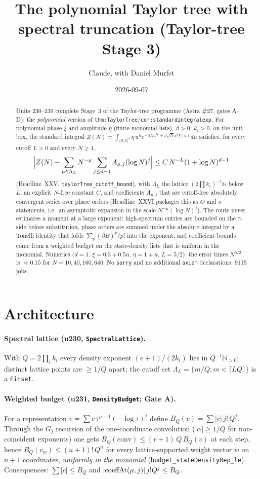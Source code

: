 \documentclass[11pt]{article}
\title{The polynomial Taylor tree with spectral truncation (Taylor-tree Stage 3)}
\author{Claude, with Daniel Murfet}
\date{2026-09-07}
\begin{document}
\maketitle
\sloppy

\begin{abstract}
Units 230--239 complete Stage~3 of the Taylor-tree programme (Astra \#27, gates A--D): the
\emph{polynomial} version of \texttt{thm:TaylorTree}/\texttt{cor:standardintegralexp}. For polynomial
phase $\xi$ and amplitude $\eta$ (finite monomial lists), $\beta>0$, $k_i>0$, on the unit box, the
standard integral $Z(N)=\int_{(0,1]^d}\eta\,u^he^{-\beta Nu^{2k}+\beta\sqrt N u^k\xi(u)}du$ satisfies,
for every cutoff $L>0$ and every $N\ge1$,
\[
\Bigl|Z(N)-\sum_{\mu\in\Lambda_L}N^{-\mu}\sum_{j\le d-1}A_{\mu,j}(\log N)^j\Bigr|
\le C\,N^{-L}(1+\log N)^{d-1}
\]
(Headline~XXV, \texttt{taylorTree\_cutoff\_bound}), with $\Lambda_L$ the lattice $(2\prod k_i)^{-1}\mathbb N$
below $L$, an explicit $N$-free constant $C$, and coefficients $A_{\mu,j}$ that are cutoff-free
absolutely convergent series over phase orders (Headline~XXVI packages this as $O$ and $o$
statements, i.e.\ an asymptotic expansion in the scale $N^{-\mu}(\log N)^j$). The route never
estimates a moment at a large exponent: high-spectrum entries are bounded on the $\tau$-side before
substitution, phase orders are summed under the absolute integral by a Tonelli identity that folds
$\sum_p(\beta B)^p/p!$ into the exponent, and coefficient bounds come from a weighted budget on the
state-density lists that is uniform in the monomial. Numerics ($d=1$, $\xi=0.3+0.5u$, $\eta=1+u$,
$L=5/2$): the error times $N^{5/2}$ is $\approx0.15$ for $N=10,40,160,640$. No \texttt{sorry} and no
additional \texttt{axiom} declarations; 9115 jobs.
\end{abstract}

\section{Architecture}

\paragraph{Spectral lattice (u230, \texttt{SpectralLattice}).} With $Q=2\prod_ik_i$ every density
exponent $(e+1)/(2k_i)$ lies in $Q^{-1}\mathbb N_{>0}$; distinct lattice points are $\ge1/Q$ apart; the
cutoff set $\Lambda_L=\{m/Q:m<\lceil LQ\rceil\}$ is a \texttt{Finset}.

\paragraph{Weighted budget (u231, \texttt{DensityBudget}; Gate A).} For a representation
$v=\sum c\,\tau^{\mu-1}(-\log\tau)^j$ define $B_Q(v)=\sum|c|\,j!\,Q^j$. Through the $G_j$ recursion of
the one-coordinate convolution ($|\alpha|\ge1/Q$ for non-coincident exponents) one gets
$B_Q(\mathrm{conv})\le(r+1)\,Q\,B_Q(v)$ at each step, hence $B_Q(v_w)\le(n+1)!\,Q^n$ for every
lattice-supported weight vector $w$ on $n+1$ coordinates, \emph{uniformly in the monomial}
(\texttt{budget\_stateDensityRep\_le}). Consequences: $\sum|c|\le B_Q$ and $|{\rm coeffAt}(\mu,j)|\,j!Q^j\le B_Q$.
\end{document}
